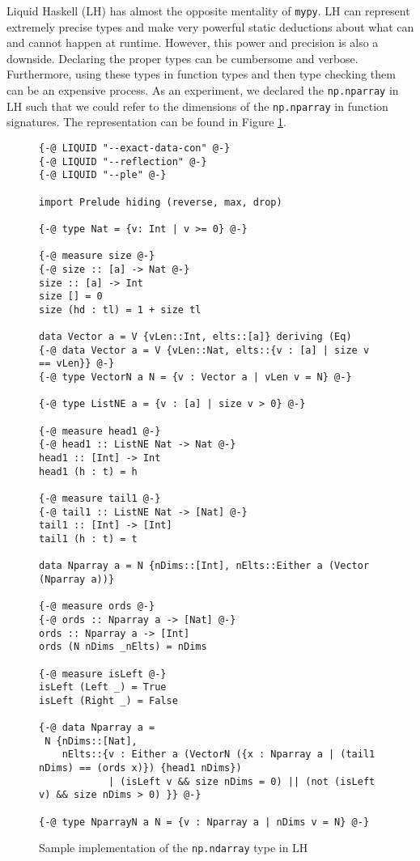 \documentclass{article}
\begin{document}
Liquid Haskell (LH) has almost the opposite mentality of \texttt{mypy}. LH can represent extremely precise types and make very powerful static deductions about what can and cannot happen at runtime. However, this power and precision is also a downside. Declaring the proper types can be cumbersome and verbose. Furthermore, using these types in function types and then type checking them can be an expensive process. As an experiment, we declared the \texttt{np.nparray} in LH such that we could refer to the dimensions of the \texttt{np.nparray} in function signatures. The representation can be found in Figure \ref{lh-nparray}.

\begin{figure}
    \centering
    \begin{verbatim}
{-@ LIQUID "--exact-data-con" @-}
{-@ LIQUID "--reflection" @-}
{-@ LIQUID "--ple" @-}

import Prelude hiding (reverse, max, drop)

{-@ type Nat = {v: Int | v >= 0} @-}

{-@ measure size @-}
{-@ size :: [a] -> Nat @-}
size :: [a] -> Int
size [] = 0
size (hd : tl) = 1 + size tl

data Vector a = V {vLen::Int, elts::[a]} deriving (Eq)
{-@ data Vector a = V {vLen::Nat, elts::{v : [a] | size v == vLen}} @-}
{-@ type VectorN a N = {v : Vector a | vLen v = N} @-}

{-@ type ListNE a = {v : [a] | size v > 0} @-}

{-@ measure head1 @-}
{-@ head1 :: ListNE Nat -> Nat @-}
head1 :: [Int] -> Int
head1 (h : t) = h

{-@ measure tail1 @-}
{-@ tail1 :: ListNE Nat -> [Nat] @-}
tail1 :: [Int] -> [Int]
tail1 (h : t) = t

data Nparray a = N {nDims::[Int], nElts::Either a (Vector (Nparray a))}

{-@ measure ords @-}
{-@ ords :: Nparray a -> [Nat] @-}
ords :: Nparray a -> [Int]
ords (N nDims _nElts) = nDims

{-@ measure isLeft @-}
isLeft (Left _) = True
isLeft (Right _) = False

{-@ data Nparray a =
 N {nDims::[Nat],
    nElts::{v : Either a (VectorN ({x : Nparray a | (tail1 nDims) == (ords x)}) {head1 nDims})
            | (isLeft v && size nDims = 0) || (not (isLeft v) && size nDims > 0) }} @-}

{-@ type NparrayN a N = {v : Nparray a | nDims v = N} @-}\end{verbatim}

    \caption{Sample implementation of the \texttt{np.ndarray} type in LH}
    \label{lh-nparray}


\end{figure}
\end{document}
